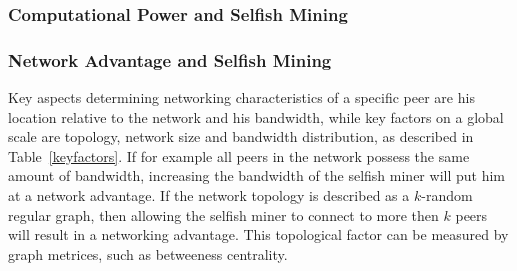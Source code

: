 \subsubsection{Computational Power and Selfish Mining}


\subsubsection{Network Advantage and Selfish Mining}
Key aspects determining networking characteristics of a specific peer are his location relative to the network and his bandwidth, while key factors on a global scale are topology, network size and bandwidth distribution, as described in Table~\ref{keyfactors}. If for example all peers in the network possess the same amount of bandwidth, increasing the bandwidth of the selfish miner will put him at a network advantage.
If the network topology is described as a $k$-random regular graph, then allowing the selfish miner to connect to more then $k$ peers will result in a networking advantage. This topological factor can be measured by graph metrices, such as betweeness centrality.


